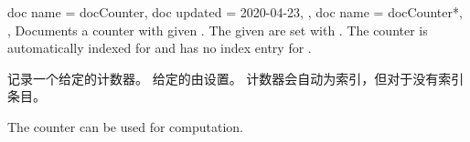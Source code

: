 \begin{docCommands}[doc parameter=\oarg{options}\marg{name}]
{
  {
    doc name    = docCounter,
    doc updated = 2020-04-23,
  },
  {
    doc name = docCounter*,
  },
}
Documents a counter with given .
The given  are set with .
The counter is automatically indexed for 
and has no index entry for .

记录一个给定的计数器。 给定的由设置。 计数器会自动为索引，但对于没有索引条目。
\begin{dispExample}
The counter  can be used for computation.
\end{dispExample}
\end{docCommands}